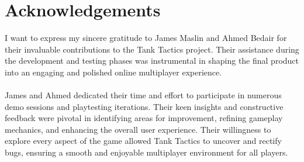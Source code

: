 \chapter*{\center \Large  Acknowledgements}
I want to express my sincere gratitude to James Maslin and Ahmed Bedair for their invaluable contributions to the Tank Tactics project. Their assistance during the development and testing phases was instrumental in shaping the final product into an engaging and polished online multiplayer experience.
\\
\noindent
\\
James and Ahmed dedicated their time and effort to participate in numerous demo sessions and playtesting iterations. Their keen insights and constructive feedback were pivotal in identifying areas for improvement, refining gameplay mechanics, and enhancing the overall user experience. Their willingness to explore every aspect of the game allowed Tank Tactics to uncover and rectify bugs, ensuring a smooth and enjoyable multiplayer environment for all players.
